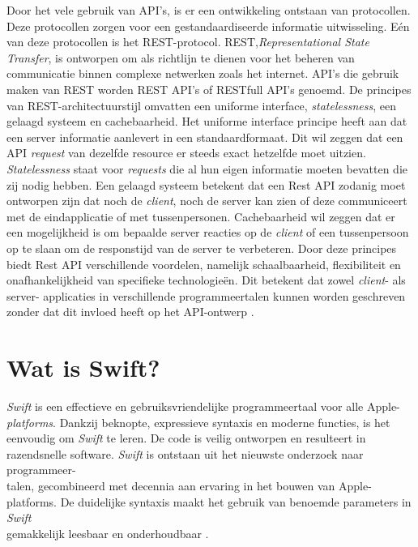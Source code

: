 Door het vele gebruik van API’s, is er een ontwikkeling ontstaan van protocollen. Deze protocollen zorgen voor een gestandaardiseerde informatie uitwisseling. Eén van deze protocollen is het REST-protocol. REST,\textit{Representational State Transfer}, is ontworpen om als richtlijn te dienen voor het beheren van communicatie binnen complexe netwerken zoals het internet. API’s die gebruik maken van REST worden REST API’s of RESTfull API’s genoemd. De principes van REST-architectuurstijl omvatten een uniforme interface, \textit{statelessness}, een gelaagd systeem en cachebaarheid. Het uniforme interface principe heeft aan dat een server informatie aanlevert in een standaardformaat. Dit wil zeggen dat een API \textit{request} van dezelfde resource er steeds exact hetzelfde moet uitzien. \textit{Statelessness} staat voor \textit{requests} die al hun eigen informatie moeten bevatten die zij nodig hebben. Een gelaagd systeem betekent dat een Rest API zodanig moet ontworpen zijn dat noch de \textit{client}, noch de server kan zien of deze communiceert met de eindapplicatie of met  tussenpersonen. Cachebaarheid wil zeggen dat er een mogelijkheid is om bepaalde server reacties op de \textit{client} of een tussenpersoon op te slaan om de responstijd van de server te verbeteren. Door deze principes biedt Rest API verschillende voordelen, namelijk schaalbaarheid, flexibiliteit en onafhankelijkheid van specifieke technologieën. Dit betekent dat zowel \textit{client}- als server- applicaties in verschillende programmeertalen kunnen worden geschreven zonder dat dit invloed heeft op het API-ontwerp \autocite{IBM}.  \\

\section{Wat is Swift?}

\textit{Swift} is een effectieve en gebruiksvriendelijke programmeertaal voor alle Apple-\textit{platforms}. Dankzij beknopte, expressieve syntaxis en moderne functies, is het \\eenvoudig om \textit{Swift} te leren. De code is veilig ontworpen en resulteert in razendsnelle software. 
\textit{Swift} is ontstaan uit het nieuwste onderzoek naar programmeer-\\talen, gecombineerd met decennia aan ervaring in het bouwen van Apple-platforms. De duidelijke syntaxis maakt het gebruik van benoemde parameters in \textit{Swift} \\gemakkelijk leesbaar en onderhoudbaar \autocite{Swift}.  \\

